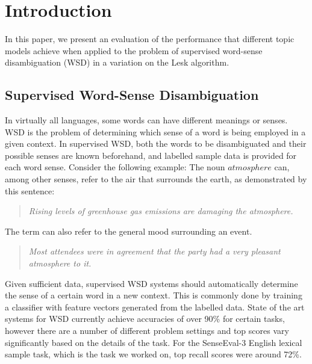 \section{Introduction}
In this paper, we present an evaluation of the performance that different topic models achieve when applied to the problem of supervised word-sense disambiguation (WSD) in a variation on the Lesk algorithm. 

\subsection{Supervised Word-Sense Disambiguation}
In virtually all languages, some words can have different meanings or senses. WSD is the problem of determining  which sense of a word is being employed in a given context. In supervised WSD, both the words to be disambiguated and their possible senses are known beforehand, and labelled sample data is provided for each word sense. Consider the following example: The noun $atmosphere$ can, among other senses, refer to the air that surrounds the earth, as demonstrated by this sentence:\\
\begin{quotation}
\textit{Rising levels of greenhouse gas emissions are damaging the atmosphere.\\}
\end{quotation}
The term can also refer to the general mood surrounding an event. 
\begin{quotation}
\textit{Most attendees were in agreement that the party had a very pleasant atmosphere to it.\\}
\end{quotation}
Given sufficient data, supervised WSD systems should automatically determine the sense of a certain word in a new context. This is commonly done by training a classifier with feature vectors generated from the labelled data. State of the art systems for WSD currently achieve accuracies of over 90\% for certain tasks, however there are a number of different problem settings and top scores vary significantly based on the details of the task. For the SenseEval-3 English lexical sample task, which is the task we worked on, top recall scores were around 72\%\cite{senseval3paper}.


